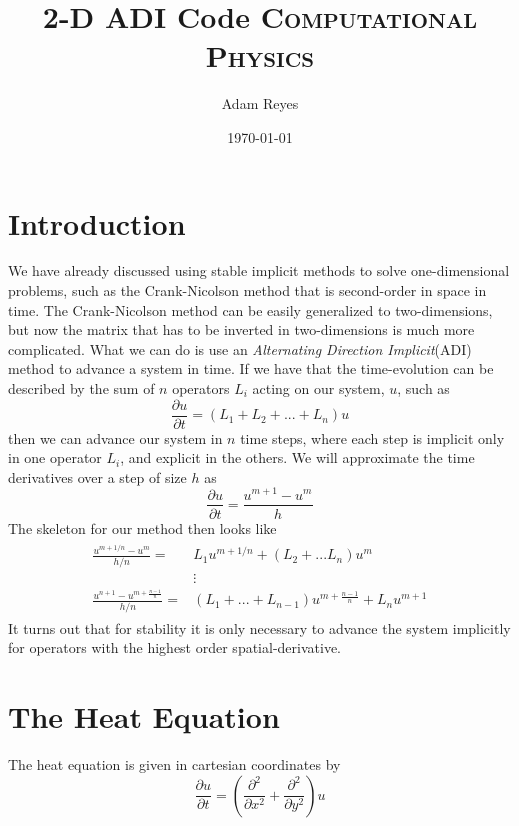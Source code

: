 \documentclass[paper=a4, fontsize=11pt, abstract=on]{scrartcl} %
\title{	
2-D ADI Code
\horrule{0.5pt}
\normalfont \normalsize 
\textsc{Computational Physics}
}
\author{Adam Reyes} %
\date{\normalsize\today} %
\numberwithin{equation}{section}
\numberwithin{figure}{section}
\numberwithin{table}{section}
\begin{document}
\maketitle

\section{Introduction}
\label{sec:intro}

We have already discussed using stable implicit methods to solve one-dimensional problems, such as the Crank-Nicolson method that is second-order in space in time. The Crank-Nicolson method can be easily generalized to two-dimensions, but now the matrix that has to be inverted in two-dimensions is much more complicated. What we can do is use an \emph{Alternating Direction Implicit}(ADI) method to advance a system in time. If we have that the time-evolution can be described by the sum of $n$ operators $L_i$ acting on our system, $u$, such as
\begin{equation}
  \label{eq:system}
  \frac{\partial u}{\partial t} = (L_1 + L_2 + ... + L_n)u
\end{equation}
then we can advance our system in $n$ time steps, where each step is implicit only in one operator $L_i$, and explicit in the others. We will approximate the time derivatives over a step of size $h$ as
\begin{equation}
  \label{eq:timeD}
  \frac{\partial u}{\partial t} = \frac{u^{m+1}-u^m}{h}
\end{equation}
The skeleton for our method then looks like
\begin{align}
  \label{eq:adi}
  \begin{split}
    \frac{u^{m+1/n}- u^m}{h/n} =& L_1u^{m+1/n} + (L_2 + ... L_n)u^m\\
    &\vdots\\
    \frac{u^{n+1}- u^{m+\frac{n-1}{n}}}{h/n} =& (L_1 + ... + L_{n-1})u^{m+\frac{n-1}{n}} + L_nu^{m+1}
  \end{split}
\end{align}
It turns out that for stability it is only necessary to advance the system implicitly for operators with the highest order spatial-derivative\cite{numerical}. 

\section{The Heat Equation}
\label{sec:heat}

The heat equation is given in cartesian coordinates by
\begin{equation}
  \label{eq:heat}
  \frac{\partial u}{\partial t} =
  \left(
    \frac{\partial ^2}{\partial x ^2} + \frac{\partial ^2}{\partial y ^2}
  \right)u
\end{equation}
\end{document}
